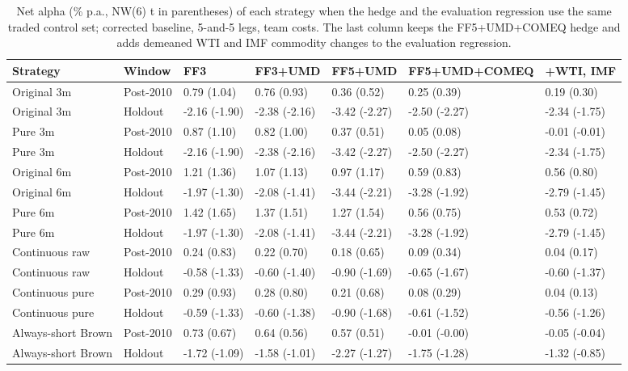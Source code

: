 \begin{table}
\caption{Net alpha (\% p.a., NW(6) t in parentheses) of each strategy when the hedge and the evaluation regression use the same traded control set; corrected baseline, 5-and-5 legs, team costs. The last column keeps the FF5+UMD+COMEQ hedge and adds demeaned WTI and IMF commodity changes to the evaluation regression.}
\label{tab:m2_strategy_controls}
\begin{tabular}{lllllll}
\toprule
Strategy & Window & FF3 & FF3+UMD & FF5+UMD & FF5+UMD+COMEQ & +WTI, IMF \\
\midrule
Original 3m & Post-2010 & 0.79 (1.04) & 0.76 (0.93) & 0.36 (0.52) & 0.25 (0.39) & 0.19 (0.30) \\
Original 3m & Holdout & -2.16 (-1.90) & -2.38 (-2.16) & -3.42 (-2.27) & -2.50 (-2.27) & -2.34 (-1.75) \\
Pure 3m & Post-2010 & 0.87 (1.10) & 0.82 (1.00) & 0.37 (0.51) & 0.05 (0.08) & -0.01 (-0.01) \\
Pure 3m & Holdout & -2.16 (-1.90) & -2.38 (-2.16) & -3.42 (-2.27) & -2.50 (-2.27) & -2.34 (-1.75) \\
Original 6m & Post-2010 & 1.21 (1.36) & 1.07 (1.13) & 0.97 (1.17) & 0.59 (0.83) & 0.56 (0.80) \\
Original 6m & Holdout & -1.97 (-1.30) & -2.08 (-1.41) & -3.44 (-2.21) & -3.28 (-1.92) & -2.79 (-1.45) \\
Pure 6m & Post-2010 & 1.42 (1.65) & 1.37 (1.51) & 1.27 (1.54) & 0.56 (0.75) & 0.53 (0.72) \\
Pure 6m & Holdout & -1.97 (-1.30) & -2.08 (-1.41) & -3.44 (-2.21) & -3.28 (-1.92) & -2.79 (-1.45) \\
Continuous raw & Post-2010 & 0.24 (0.83) & 0.22 (0.70) & 0.18 (0.65) & 0.09 (0.34) & 0.04 (0.17) \\
Continuous raw & Holdout & -0.58 (-1.33) & -0.60 (-1.40) & -0.90 (-1.69) & -0.65 (-1.67) & -0.60 (-1.37) \\
Continuous pure & Post-2010 & 0.29 (0.93) & 0.28 (0.80) & 0.21 (0.68) & 0.08 (0.29) & 0.04 (0.13) \\
Continuous pure & Holdout & -0.59 (-1.33) & -0.60 (-1.38) & -0.90 (-1.68) & -0.61 (-1.52) & -0.56 (-1.26) \\
Always-short Brown & Post-2010 & 0.73 (0.67) & 0.64 (0.56) & 0.57 (0.51) & -0.01 (-0.00) & -0.05 (-0.04) \\
Always-short Brown & Holdout & -1.72 (-1.09) & -1.58 (-1.01) & -2.27 (-1.27) & -1.75 (-1.28) & -1.32 (-0.85) \\
\bottomrule
\end{tabular}
\end{table}
